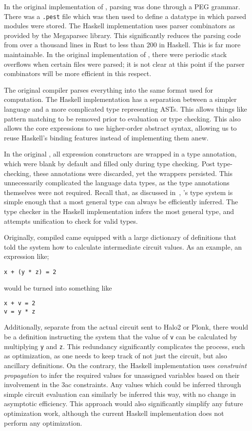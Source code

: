 \documentclass[
    9pt,            
    techreport,       
    affiltop,       
]{art}
\begin{document}
In the original implementation of \VampIR{}, parsing was done through a PEG grammar. There was a \texttt{.pest} file which was then used to define a datatype in which parsed modules were stored. The Haskell implementation uses parser combinators as provided by the Megaparsec library. This significantly reduces the parsing code from over a thousand lines in Rust to less than 200 in Haskell. This is far more maintainable. In the original implementation of \VampIR{}, there were periodic stack overflows when certain files were parsed; it is not clear at this point if the parser combinators will be more efficient in this respect.

The original \VampIR{} compiler parses everything into the same format used for computation. The Haskell implementation has a separation between a simpler  language and a more complicated type representing \VampIR{} ASTs. This allows things like pattern matching to be removed prior to evaluation or type checking. This also allows the core expressions to use higher-order abstract syntax, allowing us to reuse Haskell's binding features instead of implementing them anew.

In the original \VampIR{}, all expression constructors are wrapped in a type annotation, which were blank by default and filled only during type checking. Post type-checking, these annotations were discarded, yet the wrappers persisted. This unnecessarily complicated the language data types, as the type annotations themselves were not required. Recall that,
as discussed in~, 
\VampIR{}'s type system is simple enough that a most general type can always be efficiently inferred. The type checker in the Haskell implementation infers the most general type, and attempts unification to check for valid types.

Originally, compiled \VampIR{} came equipped with a large dictionary of definitions that told the system how to calculate intermediate circuit values. As an example, an expression like;

\begin{verbatim}
x + (y * z) = 2
\end{verbatim}
would be turned into something like
\begin{verbatim}
x + v = 2
v = y * z
\end{verbatim}

Additionally, separate from the actual circuit sent to Halo2 or Plonk, there would be a definition instructing the system that the
value of \texttt{v} can be calculated by multiplying \texttt{y} and \texttt{z}. This redundancy significantly complicates the process, such as optimization, as one needs to keep track of not just the circuit, but also ancillary definitions. On the contrary, the Haskell implementation uses \emph{constraint propagation} to infer the required values for unassigned variables based on their involvement in the \textsf{3ac} constraints. Any values which could be inferred through simple circuit evaluation can similarly be inferred this way, with no change in asymptotic efficiency. This approach would also significantly simplify any future optimization work, although the current Haskell implementation does not perform any optimization.
\end{document}
